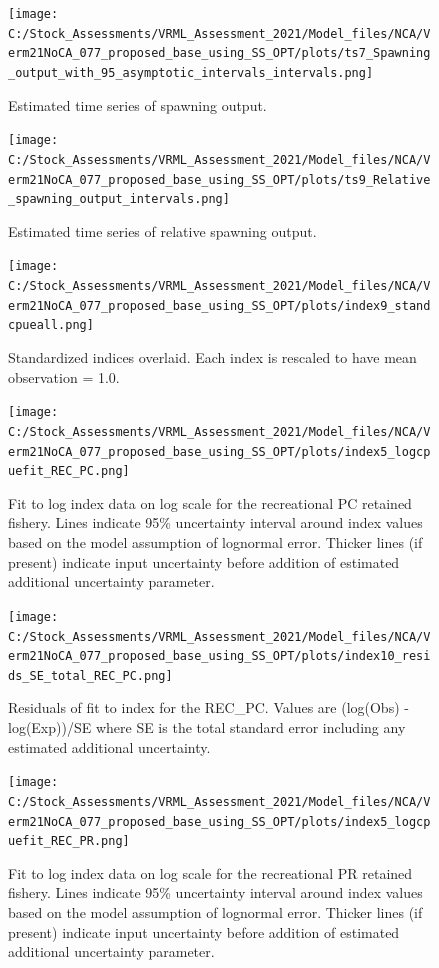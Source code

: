 \documentclass[11pt,
  english,
  a4paper,
]{article}
\begin{document}
\FloatBarrier

\begin{figure}
\centering
\texttt{[image: C:/Stock\_Assessments/VRML\_Assessment\_2021/Model\_files/NCA/Verm21NoCA\_077\_proposed\_base\_using\_SS\_OPT/plots/ts7\_Spawning\_output\_with\_95\_asymptotic\_intervals\_intervals.png]}
\caption{Estimated time series of spawning output.\label{fig:ssb}}
\end{figure}

\begin{figure}
\centering
\texttt{[image: C:/Stock\_Assessments/VRML\_Assessment\_2021/Model\_files/NCA/Verm21NoCA\_077\_proposed\_base\_using\_SS\_OPT/plots/ts9\_Relative\_spawning\_output\_intervals.png]}
\caption{Estimated time series of relative spawning output.\label{fig:depl}}
\end{figure}

\FloatBarrier

\begin{figure}
\centering
\texttt{[image: C:/Stock\_Assessments/VRML\_Assessment\_2021/Model\_files/NCA/Verm21NoCA\_077\_proposed\_base\_using\_SS\_OPT/plots/index9\_standcpueall.png]}
\caption{Standardized indices overlaid. Each index is rescaled to have mean observation = 1.0.\label{fig:cpueall}}
\end{figure}

\begin{figure}
\centering
\texttt{[image: C:/Stock\_Assessments/VRML\_Assessment\_2021/Model\_files/NCA/Verm21NoCA\_077\_proposed\_base\_using\_SS\_OPT/plots/index5\_logcpuefit\_REC\_PC.png]}
\caption{Fit to log index data on log scale for the recreational PC retained fishery. Lines indicate 95\% uncertainty interval around index values based on the model assumption of lognormal error. Thicker lines (if present) indicate input uncertainty before addition of estimated additional uncertainty parameter.\label{fig:log-cpue-REC-PC}}
\end{figure}

\begin{figure}
\centering
\texttt{[image: C:/Stock\_Assessments/VRML\_Assessment\_2021/Model\_files/NCA/Verm21NoCA\_077\_proposed\_base\_using\_SS\_OPT/plots/index10\_resids\_SE\_total\_REC\_PC.png]}
\caption{Residuals of fit to index for the REC\_PC. Values are (log(Obs) - log(Exp))/SE where SE is the total standard error including any estimated additional uncertainty.\label{fig:cpue-resid-REC-PC}}
\end{figure}

\begin{figure}
\centering
\texttt{[image: C:/Stock\_Assessments/VRML\_Assessment\_2021/Model\_files/NCA/Verm21NoCA\_077\_proposed\_base\_using\_SS\_OPT/plots/index5\_logcpuefit\_REC\_PR.png]}
\caption{Fit to log index data on log scale for the recreational PR retained fishery. Lines indicate 95\% uncertainty interval around index values based on the model assumption of lognormal error. Thicker lines (if present) indicate input uncertainty before addition of estimated additional uncertainty parameter.\label{fig:log-cpue-REC-PR}}
\end{figure}
\end{document}
